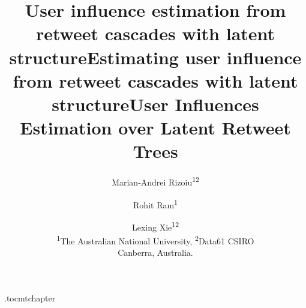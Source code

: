 \documentclass[letterpaper]{article} %
\begin{document}
\etocdepthtag.toc{mtchapter}
%
\title{User influence estimation from retweet cascades with latent structure}
\title{Estimating user influence from retweet cascades with latent structure}
\title{User Influences Estimation over Latent Retweet Trees}
\author{
	Marian-Andrei Rizoiu\textsuperscript{1}\textsuperscript{2} 
	\and Rohit Ram\textsuperscript{1}
	\and Lexing Xie\textsuperscript{1}\textsuperscript{2}\\ 
	\textsuperscript{1}The Australian National University,
	\textsuperscript{2}Data61 CSIRO\\
	Canberra, Australia.\\
}

\maketitle

\begin{abstract}
	
\end{abstract}




%
%
%
%
%
%
%
%
%
%
%

{ %
	\fontsize{9.0pt}{10.0pt}
	\selectfont
	
	
}

%
\end{document}
